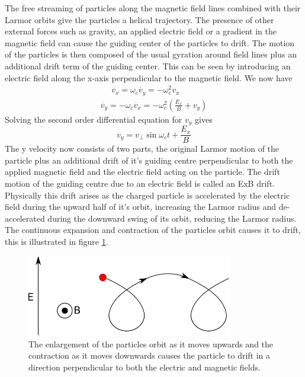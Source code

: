 The free streaming of particles along the magnetic field lines combined with their Larmor orbits give the particles a helical trajectory. The presence of other external forces such as gravity, an applied electric field or a gradient in the magnetic field can cause the guiding center of the particles to drift. The motion of the particles is then composed of the usual gyration around field lines plus an additional drift term of the guiding center. This can be seen by introducing an electric field along the x-axis perpendicular to the magnetic field. We now have 
\begin{equation}
\begin{split}
\ \ \ \ \ \ \ddot{v_x} = \omega_c \dot{v_y} = - \omega_c^2 v_x \ \ \ \ \ \ \\ 
\ddot{v_y} = - \omega_c \dot{v_x} = - \omega_c^2 \left(\frac{E_x}{B} + v_y \right)
\end{split}
\end{equation}
Solving the second order differential equation for $v_y$ gives 
\begin{equation}
v_y = v_\perp \sin{\omega_c t}  + \frac{E_x}{B}
\end{equation}
The y velocity now consists of two parts, the original Larmor motion of the particle plus an additional drift of it's guiding centre perpendicular to both the applied magnetic field and the electric field acting on the particle. The drift motion of the guiding centre due to an electric field is called an ExB drift. Physically this drift arises as the charged particle is accelerated by the electric field during the upward half of it's orbit, increasing the Larmor radius and de-accelerated during the downward swing of its orbit, reducing the Larmor radius. The continuous expansion and contraction of the particles orbit causes it to drift, this is illustrated in figure \ref{fig:exb}.
 \begin{figure}[H]
		\centering
		\includegraphics[width=0.8\textwidth]{exb.pdf}
		\caption{The enlargement of the particles orbit as it moves upwards and the contraction as it moves downwards causes the particle to drift in a direction perpendicular to both the electric and magnetic fields.}
		\label{fig:exb}
	\end{figure} 


